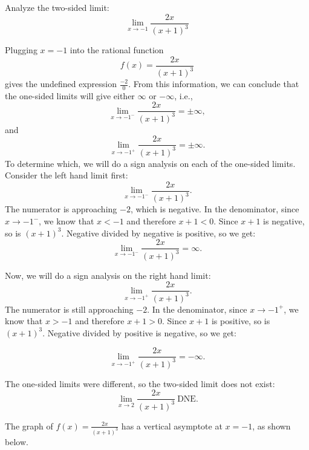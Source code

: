 \documentclass[handout]{ximera}
\begin{document}
\begin{example}[example 4]
Analyze the two-sided limit:
\[
\lim_{x\to -1} 
\frac{2x}{(x+1)^3}
\]

Plugging $x = -1$ into the rational function
\[f(x) = \frac{2x}{(x+1)^3}\]
gives the undefined expression $\frac{-2}{0}$. From this information, we can conclude 
that the one-sided limits
will give either $\infty$ or $-\infty$, i.e., 
\[\lim_{x \to -1^-} \frac{2x}{(x+1)^3}= \pm \infty,\]
and
\[\lim_{x \to -1^+} \frac{2x}{(x+1)^3}= \pm \infty.\]
To determine which, we will do a sign analysis on each of the one-sided limits. 
Consider the left hand limit first:
\[\lim_{x \to -1^-} \frac{2x}{(x+1)^3}.\]
The numerator is approaching $-2$, which is negative. In the denominator, since $x \to -1^-$, 
we know that $x<-1$ and therefore $x+1 <0$. Since $x+1$ is negative, so is $(x+1)^3$. Negative divided by 
negative is positive, so we get:
\[
\lim_{x \to -1^-} \frac{2x}{(x+1)^3} = \infty.
\]

Now, we will do a sign analysis on the right hand limit:
\[\lim_{x \to -1^+} \frac{2x}{(x+1)^3}.\]
The numerator is still approaching $-2$. In the denominator, since $x \to -1^+$, 
we know that $x>-1$ and therefore $x+1 >0$. Since $x+1$ is positive, so is $(x+1)^3$. Negative divided by 
positive is negative, so we get:

\[
\lim_{x \to -1^+} \frac{2x}{(x+1)^3} = -\infty.
\]

The one-sided limits were different, so the two-sided limit does not exist:
\[\lim_{x \to 2} \frac{2x}{(x+1)^3} \ \text{DNE}.\]

The graph of $f(x) = \frac{2x}{(x+1)^3}$ has a vertical asymptote at $x = -1$, as shown below.

\begin{center}
\end{center}
\end{example}
\end{document}
